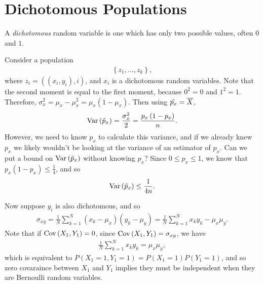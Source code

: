 \section{Dichotomous Populations}

\begin{defn}
    A \emph{dichotomous} random variable is one which has only two possible values, often $0$ and $1$.
\end{defn}

\begin{exmp}
    Consider a population
    \begin{align*}
        \left\{z_1, \ldots, z_k\right\},
    \end{align*}
    where $z_i = \left((x_i, y_i), i\right)$, and $x_i$ is a dichotomous random variables. Note that the second moment is equal to the first moment, because $0^2 = 0$ and $1^2 = 1$. Therefore, $\sigma_x^2 = \mu_x - \mu_x^2 = \mu_x\left(1 - \mu_x\right)$. Then using $\hat{p_x} = \overline{X}$,
    \begin{align*}
        \operatorname{Var}\left(\hat{p}_x\right) = \frac{\sigma_x^2}{2} = \frac{p_x\left(1-p_x\right)}{n}.
    \end{align*}
    However, we need to know $p_x$ to calculate this variance, and if we already knew $p_x$ we likely wouldn't be looking at the variance of an estimator of $p_x$. Can we put a bound on $\operatorname{Var}\left(\hat{p}_x\right)$ without knowing $p_x$? Since $0 \leq p_{x} \leq 1$, we know that $p_{x}\left(1 - p_{x}\right) \leq \frac{1}{4}$, and so
    \begin{align*}
        \operatorname{Var}\left(\hat{p}_x\right) \leq \frac{1}{4n}.
    \end{align*}

    Now suppose $y_i$ is also dichotomous, and so
    \begin{align*}
        \sigma_{xy} = \frac{1}{N}\sum_{k=1}^{N}\left(x_k - \mu_x\right)\left(y_k - \mu_y\right) = \frac{1}{N}\sum_{k=1}^{N}x_ky_k - \mu_x\mu_y.
    \end{align*}
    Note that if $\operatorname{Cov}\left(X_1, Y_1\right) = 0$, since $\operatorname{Cov}\left(X_1, Y_1\right) = \sigma_{xy}$, we have
    \begin{align*}
        \frac{1}{N}\sum_{k=1}^{N}x_ky_k = \mu_x\mu_y,
    \end{align*}
    which is equivalent to $P(X_1 = 1, Y_1 = 1) = P(X_1 = 1)P(Y_1 = 1)$, and so zero covaraince between $X_1$ and $Y_1$ implies they must be independent when they are Bernoulli random variables.
\end{exmp}

